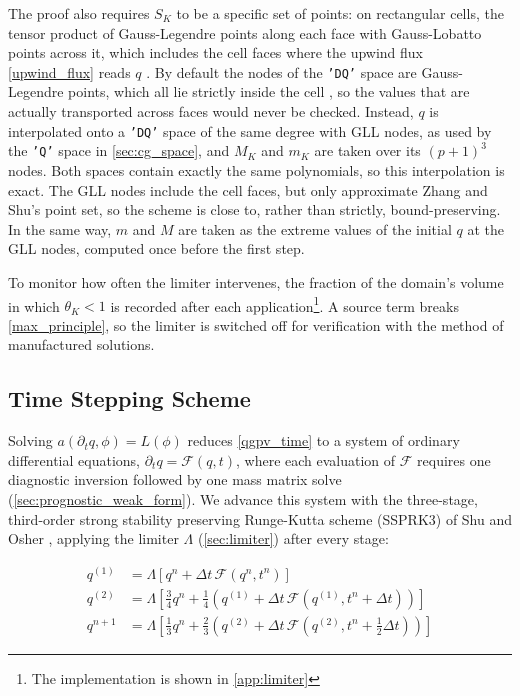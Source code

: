 \documentclass{article}
\begin{document}
The proof also requires $S_K$ to be a specific set of points: on rectangular cells, the tensor product of Gauss-Legendre points along each face with Gauss-Lobatto points across it, which includes the cell faces where the upwind flux \eqref{upwind_flux} reads $q$ \cite{ZhangShu2010}.
By default the nodes of the \texttt{'DQ'} space are Gauss-Legendre points, which all lie strictly inside the cell \cite{FiredrakeUserManual}, so the values that are actually transported across faces would never be checked.
Instead, $q$ is interpolated onto a \texttt{'DQ'} space of the same degree with GLL nodes, as used by the \texttt{'Q'} space in \cref{sec:cg_space}, and $M_K$ and $m_K$ are taken over its $(p+1)^3$ nodes.
Both spaces contain exactly the same polynomials, so this interpolation is exact.
The GLL nodes include the cell faces, but only approximate Zhang and Shu's point set, so the scheme is close to, rather than strictly, bound-preserving.
In the same way, $m$ and $M$ are taken as the extreme values of the initial $q$ at the GLL nodes, computed once before the first step.

To monitor how often the limiter intervenes, the fraction of the domain's volume in which $\theta_K < 1$ is recorded after each application\footnote{The implementation is shown in \cref{app:limiter}}.
A source term breaks \cref{max_principle}, so the limiter is switched off for verification with the method of manufactured solutions.

\subsection{Time Stepping Scheme}\label{sec:time_stepping}

Solving $a(\partial_t q, \phi) = L(\phi)$ reduces \cref{qgpv_time} to a system of ordinary differential equations, $\partial_t q = \mathcal{F}(q, t)$, where each evaluation of $\mathcal{F}$ requires one diagnostic inversion followed by one mass matrix solve (\cref{sec:prognostic_weak_form}).
We advance this system with the three-stage, third-order strong stability preserving Runge-Kutta scheme (SSPRK3) of Shu and Osher \cite{ShuOsher1988}, applying the limiter $\Lambda$ (\cref{sec:limiter}) after every stage:

\begin{equation}\label{ssprk3}
\begin{aligned}
    q^{(1)} &= \Lambda \left[ q^n + \Delta t\, \mathcal{F}(q^n, t^n) \right] \\
    q^{(2)} &= \Lambda \left[ \tfrac{3}{4} q^n + \tfrac{1}{4} \left( q^{(1)} + \Delta t\, \mathcal{F}(q^{(1)}, t^n + \Delta t) \right) \right] \\
    q^{n+1} &= \Lambda \left[ \tfrac{1}{3} q^n + \tfrac{2}{3} \left( q^{(2)} + \Delta t\, \mathcal{F}(q^{(2)}, t^n + \tfrac{1}{2}\Delta t) \right) \right]
\end{aligned}
\end{equation}
\end{document}
